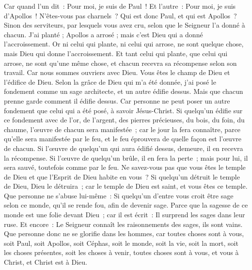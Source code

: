 \begin{multicols}{2}
Car quand l'un dit~: Pour moi, je suis de Paul~! Et l'autre~: Pour moi, je suis d'Apollos~! N'êtes-vous pas charnels~?
Qui est donc Paul, et qui est Apollos~? Sinon des serviteurs, par lesquels vous avez cru, selon que le Seigneur l'a donné à chacun.
J'ai planté ; Apollos a arrosé ; mais c'est Dieu qui a donné l'accroissement.
Or ni celui qui plante, ni celui qui arrose, ne sont quelque chose, mais Dieu qui donne l'accroissement.
Et tant celui qui plante, que celui qui arrose, ne sont qu'une même chose, et chacun recevra sa récompense selon son travail.
Car nous sommes ouvriers avec Dieu. Vous êtes le champ de Dieu et l'édifice de Dieu.
Selon la grâce de Dieu qui m'a été donnée, j'ai posé le fondement comme un sage architecte, et un autre édifie dessus. Mais que chacun prenne garde comment il édifie dessus.
Car personne ne peut poser un autre fondement que celui qui a été posé, à savoir Jésus-Christ.
Si quelqu'un édifie sur ce fondement avec de l'or, de l'argent, des pierres précieuses, du bois, du foin, du chaume, l'œuvre de chacun sera manifestée~;
car le jour la fera connaître, parce qu'elle sera manifestée par le feu, et le feu éprouvera de quelle façon est l'œuvre de chacun.
Si l'œuvre de quelqu'un qui aura édifié dessus, demeure, il en recevra la récompense.
Si l'œuvre de quelqu'un brûle, il en fera la perte~; mais pour lui, il sera sauvé, toutefois comme par le feu. 
Ne savez-vous pas que vous êtes le temple de Dieu et que l'Esprit de Dieu habite en vous~?
Si quelqu'un détruit le temple de Dieu, Dieu le détruira~; car le temple de Dieu est saint, et vous êtes ce temple.
Que personne ne s'abuse lui-même~: Si quelqu'un d'entre vous croit être sage selon ce monde, qu'il se rende fou, afin de devenir sage.
Parce que la sagesse de ce monde est une folie devant Dieu~; car il est écrit~: Il surprend les sages dans leur ruse.
Et encore~: Le Seigneur connaît les raisonnements des sages, ils sont vains.
Que personne donc ne se glorifie dans les hommes, car toutes choses sont à vous,
soit Paul, soit Apollos, soit Céphas, soit le monde, soit la vie, soit la mort, soit les choses présentes, soit les choses à venir, toutes choses sont à vous,
et vous à Christ, et Christ est à Dieu.

\end{multicols}
